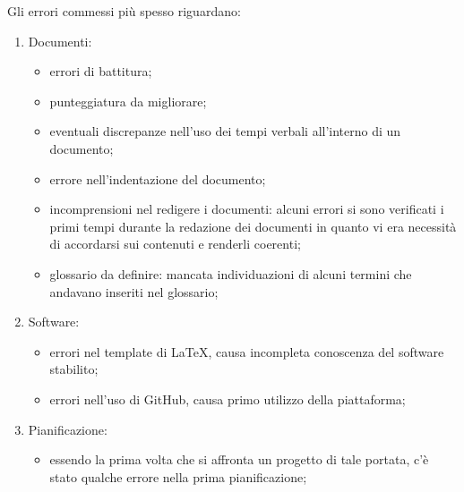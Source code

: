 \documentclass[../piano_di_qualifica.tex]{subfiles}
\begin{document}
Gli errori commessi più spesso riguardano:
\begin{enumerate}
    \item Documenti:
    \begin{itemize}
        \item errori di battitura; 
        \item punteggiatura da migliorare;
        \item eventuali discrepanze nell'uso dei tempi verbali all'interno di un documento;
        \item errore nell'indentazione del documento;
        \item incomprensioni nel redigere i documenti: alcuni errori si sono verificati i primi tempi durante la redazione dei documenti in quanto 
                vi era necessità di accordarsi sui contenuti e renderli coerenti;
        \item glossario da definire: mancata individuazioni di alcuni termini che andavano inseriti nel glossario;
    \end{itemize}
    \item Software:
    \begin{itemize}
        \item errori nel template di \LaTeX, causa incompleta conoscenza del software stabilito;
        \item errori nell'uso di GitHub, causa primo utilizzo della piattaforma;
    \end{itemize}
    \item Pianificazione:
    \begin{itemize}
        \item essendo la prima volta che si affronta un progetto di tale portata, c'è stato qualche errore nella prima pianificazione;
    \end{itemize}
\end{enumerate}
\end{document}
